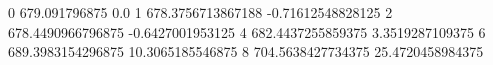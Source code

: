 0 679.091796875 0.0
1 678.3756713867188 -0.71612548828125
2 678.4490966796875 -0.6427001953125
4 682.4437255859375 3.3519287109375
6 689.3983154296875 10.3065185546875
8 704.5638427734375 25.4720458984375
